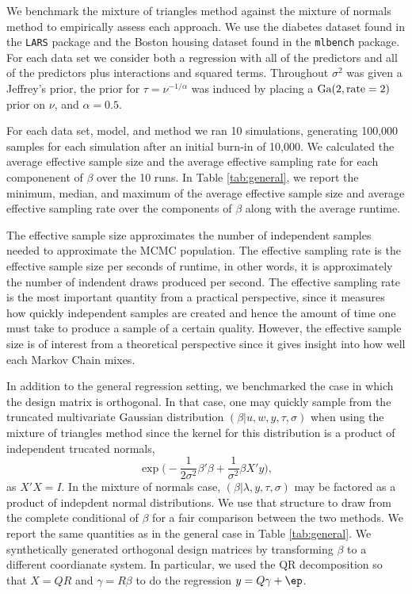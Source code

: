 \documentclass{article}
\begin{document}
We benchmark the mixture of triangles method against the mixture of normals
method to empirically assess each approach.  We use the diabetes dataset found
in the \texttt{LARS} package and the Boston housing dataset found in the
\texttt{mlbench} package.  For each data set we consider both a regression with
all of the predictors and all of the predictors plus interactions and squared
terms.  Throughout $\sigma^2$ was given a Jeffrey's prior, the prior for $\tau =
\nu^{-1/\alpha}$ was induced by placing a $\textmd{Ga}(2, \textmd{rate}=2)$
prior on $\nu$, and $\alpha = 0.5$.

For each data set, model, and method we ran 10 simulations, generating 100,000
samples for each simulation after an initial burn-in of 10,000.  We calculated
the average effective sample size and the average effective sampling rate for
each componenent of $\beta$ over the 10 runs.  In Table \ref{tab:general}, we
report the minimum, median, and maximum of the average effective sample size and
average effective sampling rate over the components of $\beta$ along with the
average runtime.

The effective sample size approximates the number of independent samples needed
to approximate the MCMC population.  The effective sampling rate is the
effective sample size per seconds of runtime, in other words, it is
approximately the number of indendent draws produced per second.  The effective
sampling rate is the most important quantity from a practical perspective, since
it measures how quickly independent samples are created and hence the amount of
time one must take to produce a sample of a certain quality.  However, the
effective sample size is of interest from a theoretical perspective since it
gives insight into how well each Markov Chain mixes.

In addition to the general regression setting, we benchmarked the case in which
the design matrix is orthogonal.  In that case, one may quickly sample from the
truncated multivariate Gaussian distribution $(\beta | u, w, y, \tau, \sigma)$
when using the mixture of triangles method since the kernel for this
distribution is a product of independent trucated normals,
\[
\exp \Big( -\frac{1}{2 \sigma^2} \beta' \beta + \frac{1}{\sigma^2} \beta X' y \Big),
\]
as $X'X = I$.  In the mixture of normals case, $(\beta | \lambda, y, \tau,
\sigma)$ may be factored as a product of indepdent normal distributions.  We use
that structure to draw from the complete conditional of $\beta$ for a fair
comparison between the two methods.  We report the same quantities as in the
general case in Table \ref{tab:general}.  We synthetically generated orthogonal
design matrices by transforming $\beta$ to a different coordianate system.  In
particular, we used the QR decomposition so that $X = QR$ and $\gamma = R \beta$
to do the regression $y = Q \gamma + \ep$.
\end{document}
